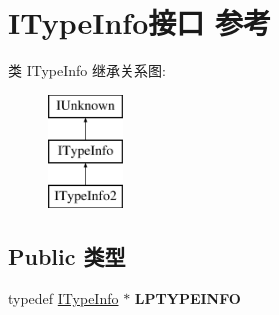 \hypertarget{interface_i_type_info}{}\section{I\+Type\+Info接口 参考}
\label{interface_i_type_info}
类 I\+Type\+Info 继承关系图\+:\begin{figure}[H]
\begin{center}
\leavevmode
\includegraphics[height=3.000000cm]{interface_i_type_info}
\end{center}
\end{figure}
\subsection*{Public 类型}
\begin{DoxyCompactItemize}
\item 
\mbox{\label{interface_i_type_info_a1232a52bef7cdb63127c2cc48281e7f6}} 
typedef \hyperlink{interface_i_type_info}{I\+Type\+Info} $\ast$ {\bfseries L\+P\+T\+Y\+P\+E\+I\+N\+FO}
\end{DoxyCompactItemize}
